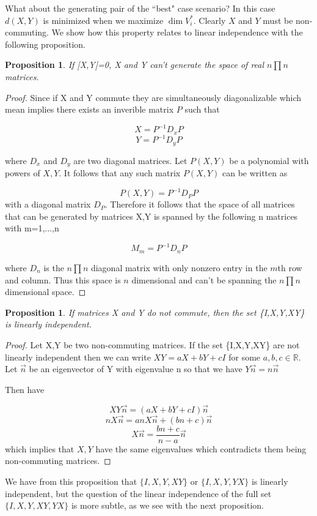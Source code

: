 \documentclass[11pt]{amsart}
\newtheorem{proposition}[theorem]{Proposition}
\numberwithin{equation}{section}
\numberwithin{figure}{section}
\numberwithin{theorem}{section}
\begin{document}
What about the generating pair of the ``best" case scenario? In this case $d(X,Y)$ is minimized when we maximize $\dim V^*_i$. Clearly $X$ and $Y$ must be non-commuting. We show how this property relates to linear independence with the following proposition. 
\begin{proposition}
If [X,Y]=0, X and Y can't generate the space of real $n \prod n$ matrices.
\end{proposition}
\begin{proof}
Since if X and Y commute they are simultaneously diagonalizable which mean implies there exists   an inverible matrix $P$ such that 

$$X=P^{-1}D_x P$$
$$Y=P^{-1}D_y P$$

where $D_x$ and $D_y$ are two diagonal matrices. Let $P(X,Y)$ be a polynomial with powers of $X,Y$. It follows that any such  matrix $P(X,Y)$ can be written as 

$$P(X,Y)=P^{-1}D_{P}P$$
with a diagonal matrix $D_P$. Therefore it follows that the space of all matrices that can be generated by matrices X,Y is spanned by the following n matrices with m=1,...,n

$$M_m=P^{-1}D_n P$$


where $D_n$ is the $n \prod n$ diagonal matrix with only nonzero entry in the $m$th row and column. Thus this space is $n$ dimensional and can't be spanning the $n \prod n$ dimensional space. 


\end{proof}
\begin{proposition}
If matrices X and Y do not commute, then the set \{I,X,Y,XY\} is linearly independent. 
\end{proposition}
\begin{proof}
 Let X,Y be two non-commuting matrices. If the set \{I,X,Y,XY\} are not linearly independent then we can write 
 $XY=aX+bY+cI$ for some $a,b,c\in \mathbb{R}$. Let $\Vec{n}$ be an eigenvector of Y with eigenvalue n so that we have 
 $Y \Vec{n}= n \Vec{n}$
 
 Then have
 
 $$XY \Vec{n} = (aX+bY+cI)\Vec{n} $$
 $$nX\Vec{n}=anX\Vec{n} +(bn+c)\Vec{n}$$
 $$X\Vec{n}= \frac{bn+c}{n-a} \Vec{n}$$
 which implies that $X,Y$ have the same eigenvalues which contradicts them being non-commuting matrices. 
\end{proof}
We have from this proposition that $\{I,X,Y,XY\}$ or $\{I,X,Y,YX\}$ is linearly independent, but the question of the linear independence of the full set $\{I,X,Y,XY,YX\}$ is more subtle, as we see with the next proposition. 
\end{document}
